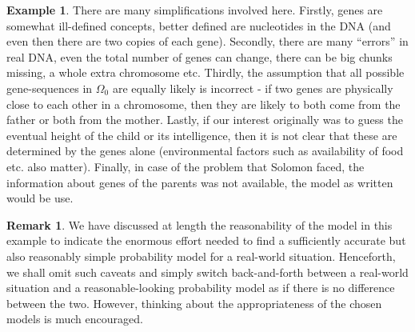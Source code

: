 \documentclass[preprint,  11pt]{amsart}
\newcommand{\parag}[1]{\vspace{4mm}\noindent{\bfseries #1}}
\theoremstyle{plain} %
\theoremstyle{definition} %
\newtheorem{remark}[theorem]{Remark}
\newtheorem{example}[theorem]{Example}
\begin{document}
\begin{example}
\parag{Reasonable model?} There are many simplifications involved here. Firstly, genes are somewhat ill-defined concepts, better defined are nucleotides in the DNA (and even then there are two copies of each gene). Secondly, there are many ``errors'' in real DNA, even the total number of genes can change, there can be big chunks missing, a whole extra chromosome etc. Thirdly, the assumption that all possible gene-sequences in $\Omega_{0}$ are equally likely is incorrect - if two genes are physically close to each other in a chromosome, then they are likely to both come from the father or both from the mother. Lastly, if our interest originally was to guess the eventual height of the child or its intelligence, then it is not clear that these are determined by the genes alone (environmental factors such as availability of food etc. also matter). Finally, in case of the problem that Solomon faced, the information about genes of the parents was not available, the model as written would be use. 
\end{example}

\begin{remark} We have discussed at length the reasonability of the model in this example to indicate the enormous effort needed to find a sufficiently  accurate but also reasonably simple probability model for a real-world situation. Henceforth, we shall omit such caveats and simply switch back-and-forth between a real-world situation and a reasonable-looking probability model as if there is no difference between the two. However, thinking about the appropriateness of the chosen models is much encouraged. 
\end{remark}

\end{document}
